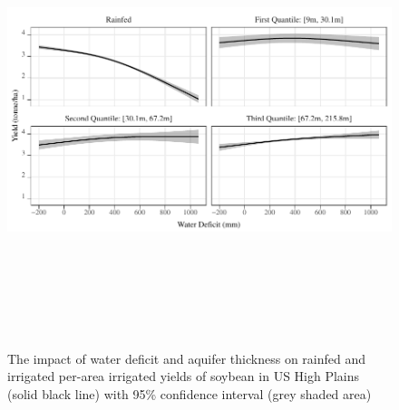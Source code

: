 \documentclass[
]{article}
\begin{document}
\begin{figure}[H]

{\centering \includegraphics[width=6in,height=500px,]{../../Figures/g_yield_with_conf_soy} 

}

\caption{The impact of water deficit and aquifer thickness on rainfed and irrigated per-area irrigated yields of soybean in US High Plains (solid black line) with 95\% confidence interval (grey shaded area)}\label{fig:irrigated-yield-ind-soy}
\end{figure}
\end{document}

